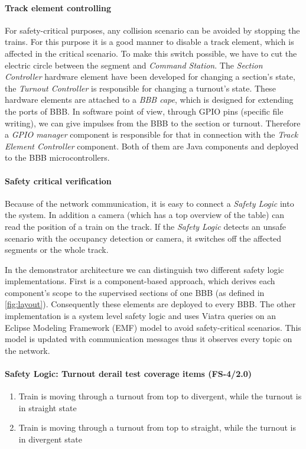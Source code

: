 \paragraph{Track element controlling}\label{par:FunctionTEC}
For safety-critical purposes, any collision scenario can be avoided by stopping the trains. For this purpose it is a good manner to disable a track element, which is affected in the critical scenario. To make this switch possible, we have to cut the electric circle between the segment and \textit{Command Station}. The \textit{Section Controller} hardware element have been developed for changing a section's state,  the \textit{Turnout Controller} is responsible for changing a turnout's state. These hardware elements are attached to a \textit{BBB cape}, which is designed for extending the ports of BBB. In software point of view, through GPIO pins (specific file writing), we can give impulses from the BBB to the section or turnout. Therefore a \textit{GPIO manager} component is responsible for that in connection with the \textit{Track Element Controller} component. Both of them are Java components and deployed to the BBB microcontrollers.

\paragraph{Safety critical verification}
Because of the network communication, it is easy to connect a \textit{Safety Logic} into the system. In addition a camera (which has a top overview of the table) can read the position of a train on the track. If the \textit{Safety Logic} detects an unsafe scenario with the occupancy detection or camera, it switches off the affected segments or the whole track.

In the demonstrator architecture we can distinguish two different safety logic implementations. First is a component-based approach, which derives each component's scope to the supervised sections of one BBB (as defined in \autoref{fig:layout}). Consequently these elements are deployed to every BBB. The other implementation is a system level safety logic and uses Viatra \cite{Viatra} queries on an Eclipse Modeling Framework (EMF) model to avoid safety-critical scenarios. This model is updated with communication messages thus it observes every topic on the network.

\paragraph{Safety Logic: Turnout derail test coverage items (FS-4/2.0)}
\begin{enumerate}[label=FS-5/2.0-\arabic*, leftmargin=*, format=\small]
	\item Train is moving through a turnout from top to divergent, while the turnout is in straight state
	\item Train is moving through a turnout from top to straight, while the turnout is in divergent state
\end{enumerate}

